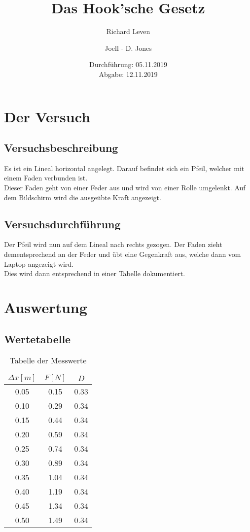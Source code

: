 \documentclass[captions=tableheading]{scrartcl}
\title{Das Hook'sche Gesetz}
\author{Richard Leven \and Joell - D. Jones}
\date{
    Durchführung: 05.11.2019\\
    Abgabe: 12.11.2019
}
\begin{document}
\maketitle
\section{Der Versuch}
\subsection{Versuchsbeschreibung}
Es ist ein Lineal horizontal angelegt. Darauf befindet sich ein Pfeil, welcher mit einem Faden verbunden ist.\\ Dieser Faden geht von einer Feder aus und wird von einer Rolle umgelenkt. Auf dem Bildschirm wird die ausgeübte Kraft angezeigt.

\subsection{Versuchsdurchführung}

Der Pfeil wird nun auf dem Lineal nach rechts gezogen. Der Faden zieht dementsprechend an der Feder und übt eine Gegenkraft aus, welche dann vom Laptop angezeigt wird.\\ Dies wird dann entsprechend in einer Tabelle dokumentiert.

\newpage
\section{Auswertung}
\subsection{Wertetabelle}
    
    \begin{table}[htp]
        \centering
        \caption{Tabelle der Messwerte}
        \label{tab:some_data}
        \begin{tabular}{c c c}
            \toprule
            $\Delta x [m]$ & $F [N]$ & $D$\\
            \midrule
            0.05 & 0.15 & 0.33 \\
            0.10 & 0.29 & 0.34 \\
            0.15 & 0.44 & 0.34 \\
            0.20 & 0.59 & 0.34 \\
            0.25 & 0.74 & 0.34 \\
            0.30 & 0.89 & 0.34 \\
            0.35 & 1.04 & 0.34 \\
            0.40 & 1.19 & 0.34 \\
            0.45 & 1.34 & 0.34 \\
            0.50 & 1.49 & 0.34 \\
            \bottomrule
        \end{tabular}
    \end{table}
\end{document}
